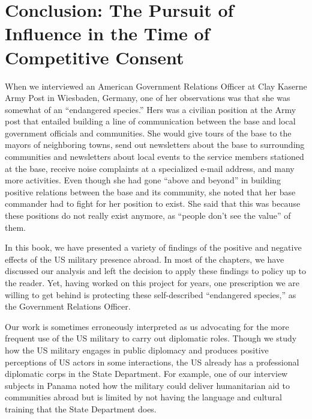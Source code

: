 \chapter{Conclusion: The Pursuit of Influence in the Time of Competitive Consent \label{cha:conclusion}}

When we interviewed an American Government Relations  Officer at Clay Kaserne Army Post in Wiesbaden, Germany, one of her observations was that she was somewhat of an ``endangered species.'' Hers was a civilian position at the Army post that entailed building a line of communication between the base and local government officials and communities. She would give tours of the base to the mayors of neighboring towns, send out newsletters about the base to surrounding communities and newsletters about local events to the service members stationed at the base, receive noise complaints at a specialized e-mail address, and many more activities. Even though she had gone ``above and beyond'' in building positive relations between the base and its community, she noted that her base commander had to fight for her position to exist. She said that this was because these positions do not really exist anymore, as ``people don't see the value'' of them.\cite{kaserneone20190725}

In this book, we have presented a variety of findings of the positive and negative effects of the US military presence abroad. In most of the chapters, we have discussed our analysis and left the decision to apply these findings to policy up to the reader. Yet, having worked on this project for years, one prescription we are willing to get behind is protecting these self-described ``endangered species,'' as the Government Relations Officer. 

Our work is sometimes erroneously interpreted as us advocating for the more frequent use of the US military to carry out diplomatic roles. Though we study how the US military engages in public diplomacy and produces positive perceptions of US actors in some interactions, the US already has a professional diplomatic corps in the State Department. For example, one of our interview subjects in Panama noted how the military could deliver humanitarian aid to communities abroad but is limited by not having the language and cultural training that the State Department does.\cite{embone20180712}

